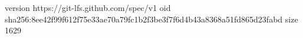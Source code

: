 version https://git-lfs.github.com/spec/v1
oid sha256:8ee42f99f612f75e33ae70a79fc1b2f3be3f7f6d4b43a8368a51fd865d23fabd
size 1629
